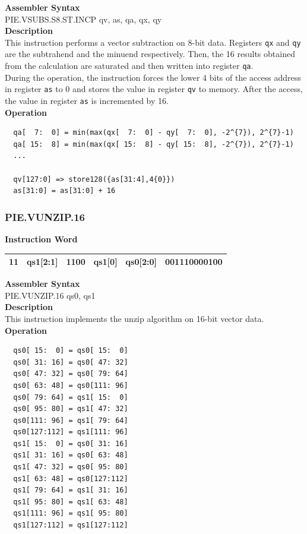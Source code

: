 \textbf{Assembler Syntax} \\
PIE.VSUBS.S8.ST.INCP qv, as, qa, qx, qy \\
\textbf{Description} \\
This instruction performs a vector subtraction on 8-bit data. Registers \lstinline{qx} and \lstinline{qy} are the subtrahend and the minuend respectively. Then, the 16 results obtained from the calculation are saturated and then written into register \lstinline{qa}. \\ During the operation, the instruction forces the lower 4 bits of the access address in register \lstinline{as} to 0 and stores the value in register \lstinline{qv} to memory. After the access, the value in register \lstinline{as} is incremented by 16.\\
\textbf{Operation}
\begin{lstlisting}
  qa[  7:  0] = min(max(qx[  7:  0] - qy[  7:  0], -2^{7}), 2^{7}-1)
  qa[ 15:  8] = min(max(qx[ 15:  8] - qy[ 15:  8], -2^{7}), 2^{7}-1)
  ...

  qv[127:0] => store128({as[31:4],4{0}})
  as[31:0] = as[31:0] + 16
\end{lstlisting}

\newpage
\subsubsection{PIE.VUNZIP.16}\label{instruction:PIEVUNZIP16}
\setlength\tabcolsep{6pt}
\textbf{Instruction Word} \\
\begin{tabular}{|c|c|c|c|c|c|}
	\hline
	11 & qs1[2:1] & 1100 & qs1[0] & qs0[2:0] & 001110000100 \\
	\hline
\end{tabular}

\textbf{Assembler Syntax} \\
PIE.VUNZIP.16 qs0, qs1 \\
\textbf{Description} \\
This instruction implements the unzip algorithm on 16-bit vector data.\\
\textbf{Operation}
\begin{lstlisting}
  qs0[ 15:  0] = qs0[ 15:  0]
  qs0[ 31: 16] = qs0[ 47: 32]
  qs0[ 47: 32] = qs0[ 79: 64]
  qs0[ 63: 48] = qs0[111: 96]
  qs0[ 79: 64] = qs1[ 15:  0]
  qs0[ 95: 80] = qs1[ 47: 32]
  qs0[111: 96] = qs1[ 79: 64]
  qs0[127:112] = qs1[111: 96]
  qs1[ 15:  0] = qs0[ 31: 16]
  qs1[ 31: 16] = qs0[ 63: 48]
  qs1[ 47: 32] = qs0[ 95: 80]
  qs1[ 63: 48] = qs0[127:112]
  qs1[ 79: 64] = qs1[ 31: 16]
  qs1[ 95: 80] = qs1[ 63: 48]
  qs1[111: 96] = qs1[ 95: 80]
  qs1[127:112] = qs1[127:112]
\end{lstlisting}

